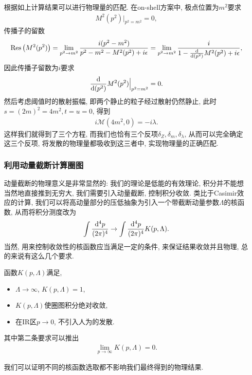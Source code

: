 根据如上计算结果可以进行物理量的匹配. 在on-shell方案中, 极点位置为$m^2$要求
\begin{align}
    M^2(p^2)\Big|_{p^2=m^2}=0,
\end{align}
传播子的留数
\begin{align}
    \mathrm{Res}\left(M^2(p^2)\right)=\lim_{p^2\to m^2}\frac{i(p^2-m^2)}{p^2-m^2-M^2(p^2)+i\epsilon}=\lim_{p^2\to m^2}\frac{i}{1-\frac{\mathrm d}{\mathrm d(p^2)}M^2(p^2)+i\epsilon},\notag
\end{align}
因此传播子留数为$i$要求
\begin{align}
    \frac{\mathrm d}{\mathrm d(p^2)}M^2(p^2)\Big|_{p^2=m^2}=0.
\end{align}
然后考虑阈值时的散射振幅, 即两个静止的粒子经过散射仍然静止, 此时$s=(2m)^2=4m^2, t=u=0$, 得到
\begin{align}
    i\mathcal M(4m^2, 0)=-i\lambda.
\end{align}
这样我们就得到了三个方程, 而我们也恰有三个反项$\delta_Z, \delta_m, \delta_\lambda$, 从而可以完全确定这三个反项, 将发散的物理量都吸收到这三者中, 实现物理量的正确匹配.

\subsubsection{利用动量截断计算圈图}
动量截断的物理意义是非常显然的: 我们的理论是低能的有效理论, 积分并不能想当然地直接推到无穷大, 我们需要引入动量截断, 控制积分收敛. 类比于Casimir效应的计算, 我们可以将高动量部分的压低抽象为引入一个带截断动量参数$\Lambda$的核函数, 从而将积分测度改为
\begin{align}
    \int\frac{\mathrm d^4p}{(2\pi)^4}\to\int\frac{\mathrm d^4p}{(2\pi)^4}K(p, \Lambda).
\end{align}
当然, 用来控制收敛性的核函数应当满足一定的条件, 来保证结果收敛并且物理, 总的来说有这么几个要求.
\begin{definition}[圈图积分的核函数]
    函数$K(p, \Lambda)$满足, 
    \begin{itemize}
        \item $\Lambda\to\infty$, $K(p, \Lambda)=1$,
        \item $K(p, \Lambda)$使圈图积分绝对收敛,
        \item 在IR区$p\to0$, 不引入人为的发散.
    \end{itemize}
\end{definition}
其中第二条要求可以推出
\begin{align}
    \lim_{p\to\infty}K(p, \Lambda)=0.
\end{align}

我们可以证明不同的核函数选取都不影响我们最终得到的物理结果.


